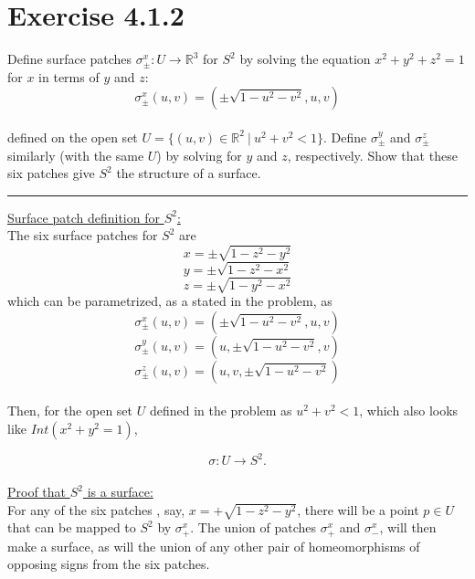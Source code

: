 \documentclass[12pt]{article}
\begin{document}
\maketitle

\section*{Exercise 4.1.2}

Define surface patches $\sigma^{x}_{\pm}:U \rightarrow \mathbb{R}^3$ for $S^2$ by solving the equation $x^2 + y^2 + z^2 = 1$ for $x$ in terms of  $y$ and $z$:
$$
\sigma^{x}_{\pm}(u,v) = (\pm \sqrt{1-u^2-v^2}, u ,v)
$$
\\
defined on the open set $U = \lbrace (u,v) \in \mathbb{R}^2 \ \vert \ u^2 + v^2 < 1\rbrace$. Define $\sigma^{y}_{\pm}$ and $\sigma^{z}_{\pm}$ similarly (with the same $U$) by solving for $y$ and $z$, respectively. Show that these six patches give $S^2$ the structure of a surface.
\vspace{1cm}
\hrule
\vspace{1cm}

\underline{Surface patch definition for $S^2$:}\\

The six surface patches for $S^2$ are
$$
x = \pm\sqrt{1-z^2-y^2}
$$
$$
y = \pm\sqrt{1-z^2-x^2}
$$
$$
z = \pm\sqrt{1-y^2-x^2}
$$
which can be parametrized, as a stated in the problem, as
$$
\sigma^{x}_{\pm}(u,v) = (\pm \sqrt{1-u^2-v^2}, u ,v)
$$
$$
\sigma^{y}_{\pm}(u,v) = (u, \pm \sqrt{1-u^2-v^2} ,v)
$$
$$
\sigma^{z}_{\pm}(u,v) = (u ,v, \pm \sqrt{1-u^2-v^2})
$$
\\
\indent
Then, for the open set $U$ defined in the problem as $u^2 + v^2 < 1$, which also looks like $Int(x^2+y^2 = 1)$,

$$
\sigma : U \rightarrow S^2.
$$
\\
\underline{Proof that $S^2$ is a surface:}\\
\indent
For any of the six patches , say, $x = +\sqrt{1-z^2-y^2}$, there will be a point $p \in U$ that can be mapped to $S^2$ by $\sigma^{x}_{+}$. The union of patches $\sigma^{x}_{+}$ and $\sigma^{x}_{-}$, will then make a surface, as will the union of any other pair of homeomorphisms of opposing signs from the six patches.
\end{document}
